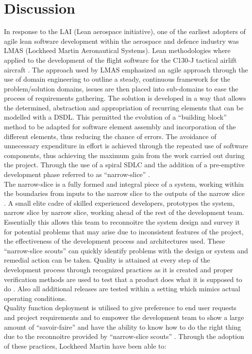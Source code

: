 \documentclass[11pt,twocolumn]{article}
\begin{document}
\section*{\textbf{Discussion}}
In response to the LAI (Lean aerospace initiative), one of the earliest adopters of agile lean software development within the aerospace and defence industry was LMAS (Lockheed Martin Aeronautical Systems). Lean methodologies where applied to the development of the flight software for the C130-J tactical airlift aircraft \citep{williams2001strategic}. The approach used by LMAS emphasized an agile approach through the use of domain engineering to outline a steady, continuous framework for the problem/solution domains, issues are then placed into sub-domains to ease the process of requirements gathering. The solution is developed in a way that allows the determined, abstraction and appropriation of recurring elements that can be modelled with a DSDL. This permitted the evolution of a “building block” method to be adapted for software element assembly and incorporation of the different elements, thus reducing the chance of errors. The avoidance of unnecessary expenditure in effort is achieved through the repeated use of software components, thus achieving the maximum gain from the work carried out during the project. Through the use of a spiral SDLC and the addition of a pre-emptive development phase referred to as “narrow-slice” \citep{middleton2005lean}. 
\\
The narrow-slice is a fully formed and integral piece of a system, working within the boundaries from inputs to the narrow slice to the outputs of the narrow slice \citep{sutton1996lean}. A small elite cadre of skilled experienced developers, prototypes the system, narrow slice by narrow slice, working ahead of the rest of the development team. Essentially this allows this team to reconnoitre the system design and survey it for potential problems that may arise due to inconsistent features of the project, the effectiveness of the development process and architectures used. These “narrow-slice scouts” can quickly identify problems with the design or system and remedial action can be taken.  Quality is attained at every step of the development process through recognized practices as it is created and proper verification methods are used to test that a product does what it is supposed to do \citep{conn2001avionics}. Also all additional releases are tested within a setting which mimics actual operating conditions.
\\
Quality function deployment is utilised to give preference to end user requests and project requirements and to empower the development team to show a large amount of “savoir-faire” and have the ability to know how to do the right thing due to the reconnoitre provided by “narrow-slice scouts” \citep{faulk1994experience}. Through the adoption of these practices, Lockheed Martin  have been able to:
\end{document}
